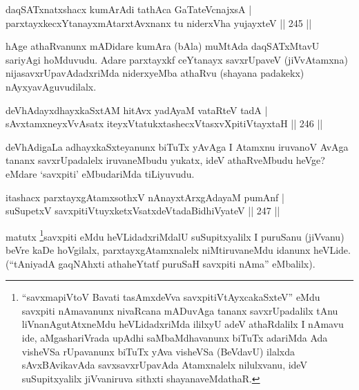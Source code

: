 
\begin{shl}
daqSATxnatxshacx kumArAdi tathAca GaTateV\s cnajxsA |\\
parxtayxkecxYtanayxmAtarxtAvxnanx tu niderxVha yujayxteV \hfill || 245 ||
\end{shl}

\begin{artha}
hAge athaRvanunx mADidare kumAra (bAla) muMtAda daqSATxMtavU sariyAgi hoMduvudu. Adare parxtayxkf ceYtanayx savxrUpaveV (jiVvAtamxna) nijasavxrUpavAdadxriMda niderxyeMba athaRvu (shayana padakekx) nAyxyavAguvudilalx.
\end{artha}

\begin{shl}
deVhAdayxdhayxkaSxtAM hitAvx yadA\s yaM vataRteV tadA |\\
sAvxtamxneyxVvA\s \s satx iteyxVtatukxtashecxVtasxvXpitiVtayxtaH \hfill || 246 ||
\end{shl}

\begin{artha}
deVhAdigaLa adhayxkaSxteyanunx biTuTx yAvAga I Atamxnu iruvanoV AvAga tananx savxrUpadalelx iruvaneMbudu yukatx, ideV athaRveMbudu heVge? eMdare `savxpiti' eMbudariMda tiLiyuvudu.
\end{artha}


\begin{shl}
itashacx parxtayxgAtamxsothxV nAnayxtArxgAdayaM pumAnf |\\
suSupetxV savxpitiVtuyxketxVsatxdeVtadaBidhiVyateV \hfill || 247 ||
\end{shl}

\begin{artha}
matutx \footnote{``savxmapiVtoV Bavati tasAmxdeVva savxpitiVtAyxcakaSxteV'' eMdu savxpiti nAmavanunx nivaRcana mADuvAga 
tananx savxrUpadalilx tAnu liVnanAgutAtxneMdu heVLidadxriMda ililxyU 
adeV athaRdalilx I nAmavu ide, aMgashariVrada upAdhi saMbaMdhavanunx biTuTx adariMda Ada visheVSa rUpavanunx biTuTx yAva visheVSa (BeVdavU) ilalxda sAvxBAvikavAda savxsavxrUpavAda Atamxnalelx nilulxvanu, ideV suSupitxyalilx jiVvaniruva sithxti shayanaveMdathaR.}savxpiti eMdu heVLidadxriMdalU suSupitxyalilx I puruSanu (jiVvanu) beVre kaDe hoVgilalx, parxtayxgAtamxnalelx niMtiruvaneMdu idanunx heVLide. (``tAniyadA gaqNAhxti athaheYtatf puruSaH savxpiti nAma'' eMbalilx).
\end{artha}


